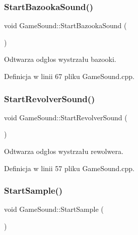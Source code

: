 \mbox{\label{class_game_sound_ab3bc96f5be15c7a9be79a035ec16638c}} 
\subsubsection{\texorpdfstring{Start\+Bazooka\+Sound()}{StartBazookaSound()}}
{\footnotesize\ttfamily void Game\+Sound\+::\+Start\+Bazooka\+Sound (\begin{DoxyParamCaption}{ }\end{DoxyParamCaption})}



Odtwarza odgłos wystrzału bazooki. 



Definicja w linii 67 pliku Game\+Sound.\+cpp.

\mbox{\label{class_game_sound_a909e0c0bc44437ea2853e734ab548e5a}} 
\subsubsection{\texorpdfstring{Start\+Revolver\+Sound()}{StartRevolverSound()}}
{\footnotesize\ttfamily void Game\+Sound\+::\+Start\+Revolver\+Sound (\begin{DoxyParamCaption}{ }\end{DoxyParamCaption})}



Odtwarza odgłos wystrzału rewolwera. 



Definicja w linii 57 pliku Game\+Sound.\+cpp.

\mbox{\label{class_game_sound_a30db244babc1e4aa518bd56500cea028}} 
\subsubsection{\texorpdfstring{Start\+Sample()}{StartSample()}}
{\footnotesize\ttfamily void Game\+Sound\+::\+Start\+Sample (\begin{DoxyParamCaption}{ }\end{DoxyParamCaption})}



